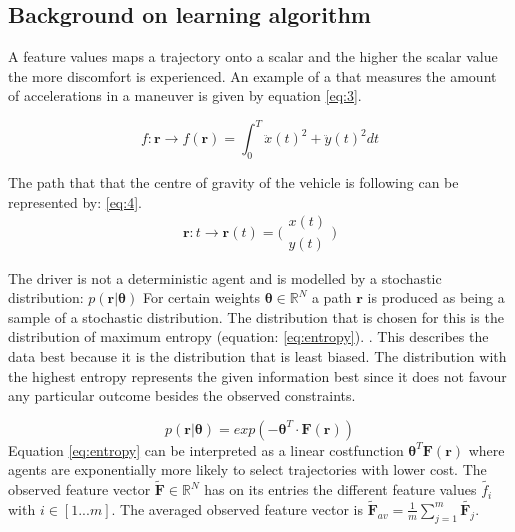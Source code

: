 \subsection{Background on learning algorithm}
A feature values maps a trajectory onto a scalar and the higher the scalar value the more discomfort is experienced. An example of a that measures the amount of accelerations in a maneuver is given by equation \ref{eq:3}.

\begin{equation}\label{eq:3}
f:\bm{r}\xrightarrow{}f(\bm{r})=\int_{0}^{T}\ddot{x}(t)^{2}+\ddot{y}(t)^{2} dt
\end{equation}

The path that that the centre of gravity of the vehicle is following can be represented by: \ref{eq:4}.
\begin{equation}\label{eq:4}
\bm{r}:t \xrightarrow{}\bm{r}(t) =  \bigl( \begin{smallmatrix} x(t)\\ y(t) \end{smallmatrix}\bigr)
\end{equation}

The driver is not a deterministic agent and is modelled by a stochastic distribution: $p(\bm{r}|\bm{\theta})$ For certain weights $\bm{\theta} \in \mathbb{R}^N$ a path $\bm{r}$ is produced as being a sample of a stochastic distribution. The distribution that is chosen for this is the distribution of maximum entropy (equation: \ref{eq:entropy}). \cite{Ziebart2008}. This describes the data best because it is the distribution that is least biased. \cite{Kuderer2015a} 
The distribution with the highest entropy represents the given information best since it does not favour any particular outcome besides the observed constraints. \cite{Abbeel2004}
	
	
\begin{equation}\label{eq:entropy}
	p(\bm{r}|\bm{\theta}) = exp(-\bm{\theta}^T\cdot \bm{F}(\bm{r}))
\end{equation}
Equation \ref{eq:entropy} can be interpreted as a linear costfunction $\bm{\theta}^T\bm{F}(\bm{r})$ where agents are exponentially more likely to select trajectories with lower cost. \cite{Kuderer2015a}
The observed feature vector $\tilde{\bm{F}} \in \mathbb{R}^N$ has on its entries the different feature values $\tilde{f_i}$ with $i \in [1...m]$. The averaged observed feature vector is $\tilde{\bm{F}}_{av} = \frac{1}{m}\sum_{j=1}^{m}\tilde{\bm{F}_j}$.\\

